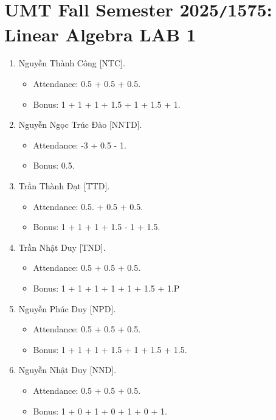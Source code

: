 \documentclass{article}
\begin{document}

\section{UMT Fall Semester 2025{\tt/}1575: Linear Algebra LAB 1}

\begin{enumerate}
    \item {\sc Nguyễn Thành Công [NTC].}
    \begin{itemize}
        \item Attendance: 0.5 + 0.5 + 0.5.
        \item Bonus: 1 + 1 + 1 + 1.5 + 1 + 1.5 + 1.
    \end{itemize}
    \item {\sc Nguyễn Ngọc Trúc Đào [NNTD].}
    \begin{itemize}
        \item Attendance: -3 + 0.5 - 1.
        \item Bonus: 0.5.
    \end{itemize}
    \item {\sc Trần Thành Đạt [TTD].}
    \begin{itemize}
        \item Attendance: 0.5. + 0.5 + 0.5.
        \item Bonus: 1 + 1 + 1 + 1.5 - 1 + 1.5.
    \end{itemize}
    \item {\sc Trần Nhật Duy [TND].}
    \begin{itemize}
        \item Attendance: 0.5 + 0.5 + 0.5.
        \item Bonus: 1 + 1 + 1 + 1 + 1 + 1.5 + 1.P
    \end{itemize}
    \item {\sc Nguyễn Phúc Duy [NPD].}
    \begin{itemize}
        \item Attendance: 0.5 + 0.5 + 0.5.
        \item Bonus: 1 + 1 + 1 + 1.5 + 1 + 1.5 + 1.5.
    \end{itemize}
    \item {\sc Nguyễn Nhật Duy [NND].}
    \begin{itemize}
        \item Attendance: 0.5 + 0.5 + 0.5.
        \item Bonus: 1 + 0 + 1 + 0 + 1 + 0 + 1.
    \end{itemize}

\end{enumerate}
\end{document}
